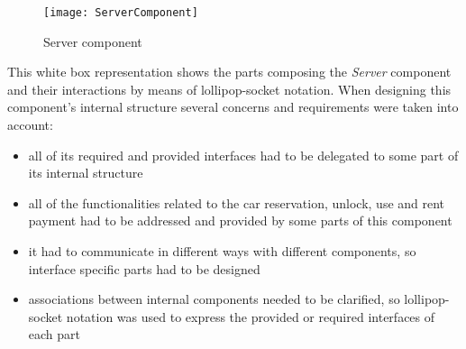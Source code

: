 \begin{figure}[h]
			\centering
			\texttt{[image: ServerComponent]}
			\caption{
				\label{fig:ServerComponent} 
				Server component
			}
		\end{figure}
\clearpage

This white box representation shows the parts composing the \emph{Server} component and their interactions by means of lollipop-socket notation. When designing this component's internal structure several concerns and requirements were taken into account:
\begin{itemize}
	\item all of its required and provided interfaces had to be delegated to some part of its internal structure
	\item all of the functionalities related to the car reservation, unlock, use and rent payment had to be addressed and provided by some parts of this component
	\item it had to communicate in different ways with different components, so interface specific parts had to be designed
	\item associations between internal components needed to be clarified, so lollipop-socket notation was used to express the provided or required interfaces of each part
\end{itemize}



